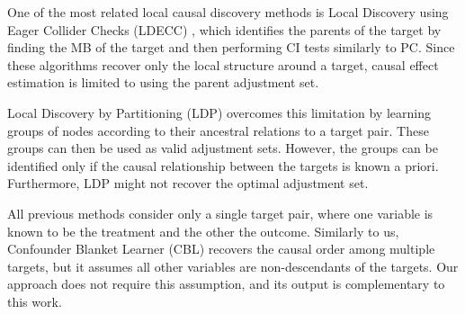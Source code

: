 One of the most related local causal discovery methods is Local Discovery using Eager Collider Checks (LDECC) \citep{gupta2023local}, which identifies the parents of the target by finding the MB of the target and then performing \ac{CI} tests similarly to PC.
Since these algorithms recover only the local structure around a target, causal effect estimation is limited to using the parent adjustment set.

Local Discovery by Partitioning (LDP) \citep{maasch2024local} overcomes this limitation by learning groups of nodes according to their ancestral relations to a target pair.
These groups can then be used as valid adjustment sets.
However, the groups can be identified only if the causal relationship between the targets is known a priori.
Furthermore, LDP might not recover the optimal adjustment set.

All previous methods consider only a single target pair, where one variable is known to be the treatment and the other the outcome.
Similarly to us, Confounder Blanket Learner (CBL) \citep{watson2022causal} recovers the causal order among multiple targets, but it assumes all other variables are non-descendants of the targets. Our approach does not require this assumption, and its output is complementary to this work.

